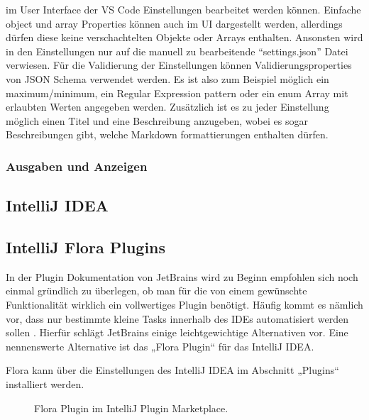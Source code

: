 \begin{description}
      im User Interface der VS Code Einstellungen bearbeitet werden können.
      Einfache object und array Properties können auch im UI dargestellt werden,
      allerdings dürfen diese keine verschachtelten Objekte oder Arrays enthalten.
      Ansonsten wird in den Einstellungen nur auf die manuell zu bearbeitende 
      \enquote{settings.json} Datei verwiesen.
      Für die Validierung der Einstellungen können Validierungsproperties
      von JSON Schema verwendet werden. Es ist also zum Beispiel möglich
      ein maximum/minimum, ein Regular Expression pattern oder ein enum Array
      mit erlaubten Werten angegeben werden.
      Zusätzlich ist es zu jeder Einstellung möglich einen Titel und eine Beschreibung
      anzugeben, wobei es sogar Beschreibungen gibt, welche Markdown formattierungen
      enthalten dürfen.
  \end{description}
\subsubsection{Ausgaben und Anzeigen}


\subsection{IntelliJ IDEA}



\subsection{IntelliJ Flora Plugins}

In der Plugin Dokumentation von JetBrains wird zu Beginn 
empfohlen sich noch einmal gründlich zu überlegen, ob man 
für die von einem gewünschte Funktionalität wirklich ein 
vollwertiges Plugin benötigt. Häufig kommt es nämlich vor, 
dass nur bestimmte kleine Tasks innerhalb des IDEs 
automatisiert werden sollen \cite{IntelliJSDKDocumentation}. Hierfür schlägt JetBrains 
einige leichtgewichtige Alternativen vor. Eine nennenswerte 
Alternative ist das „Flora Plugin“ für das IntelliJ IDEA. 

Flora kann über die Einstellungen des IntelliJ IDEA 
im Abschnitt „Plugins“ installiert werden.


\begin{figure}
    \centering
    \caption{Flora Plugin im IntelliJ Plugin Marketplace.}
    \label{fig:FloraPlugin}
\end{figure}    
 
